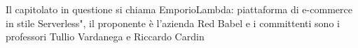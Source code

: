 Il capitolato in questione si chiama EmporioLambda: piattaforma di e-commerce in stile Serverless", il proponente \`{e} l'azienda Red Babel e i committenti sono i professori Tullio Vardanega e Riccardo Cardin
